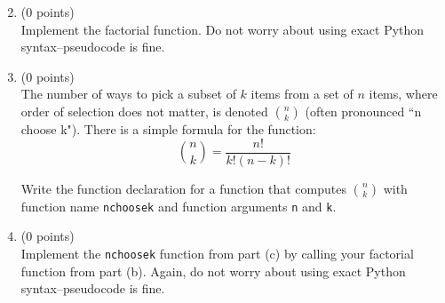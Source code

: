 \documentclass{article}
\newcounter{points}
\newcommand\setzeropoints{\addtocounter{points}{0}(0 points)}
\begin{document}
\begin{enumerate}
\begin{enumerate}
\setcounter{enumii}{1}
\item \setzeropoints \\
Implement the factorial function.  Do not worry about using exact Python syntax--pseudocode is fine.
\end{enumerate}

\begin{enumerate}
\setcounter{enumii}{2}
\item \setzeropoints \\
The number of ways to pick a subset of $k$ items from a set of $n$ items, where order of selection does not matter, is denoted ${n \choose k}$ (often pronounced ``n choose k").  There is a simple formula for the function:
\[
{n \choose k} = \frac{n!}{k!(n - k)!}
\]

Write the function declaration for a function that computes ${n \choose k}$ with function name \texttt{nchoosek} and function arguments \texttt{n} and \texttt{k}.
\end{enumerate}

\begin{enumerate}
\setcounter{enumii}{3}
\item \setzeropoints \\
Implement the \texttt{nchoosek} function from part (c) by calling your factorial function from part (b).  Again, do not worry about using exact Python syntax--pseudocode is fine.
\end{enumerate}


\end{enumerate}
\end{document}

